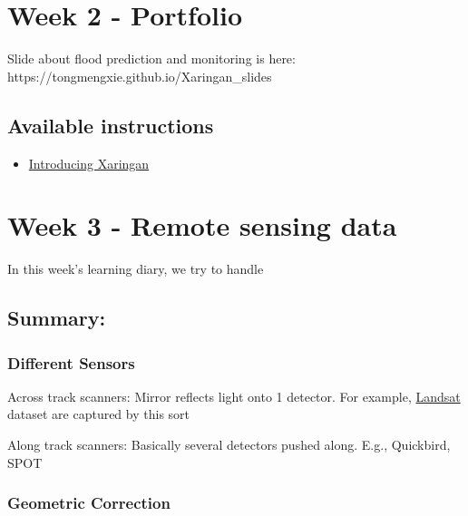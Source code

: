 \documentclass[
  letterpaper,
  DIV=11,
  numbers=noendperiod]{scrreprt}
\providecommand{\tightlist}{%
  \setlength{\itemsep}{0pt}\setlength{\parskip}{0pt}}\usepackage{longtable,booktabs,array}
\begin{document}

\hypertarget{week-2---portfolio}{%
\chapter{Week 2 - Portfolio}\label{week-2---portfolio}}

Slide about flood prediction and monitoring is here:
https://tongmengxie.github.io/Xaringan\_slides

\hypertarget{available-instructions}{%
\section{Available instructions}\label{available-instructions}}

\begin{itemize}
\tightlist
\item
  \href{https://andrewmaclachlan.github.io/CASA0023/2_portfolio.html}{Introducing
  Xaringan}
\end{itemize}


\hypertarget{week-3---remote-sensing-data}{%
\chapter{Week 3 - Remote sensing
data}\label{week-3---remote-sensing-data}}

In this week's learning diary, we try to handle

\hypertarget{summary-1}{%
\section{Summary:}\label{summary-1}}

\hypertarget{different-sensors}{%
\subsection{Different Sensors}\label{different-sensors}}

Across track scanners: Mirror reflects light onto 1 detector. For
example, \uline{Landsat} dataset are captured by this sort

Along track scanners: Basically several detectors pushed along. E.g.,
Quickbird, SPOT

\hypertarget{geometric-correction}{%
\subsection{Geometric Correction}\label{geometric-correction}}
\end{document}
